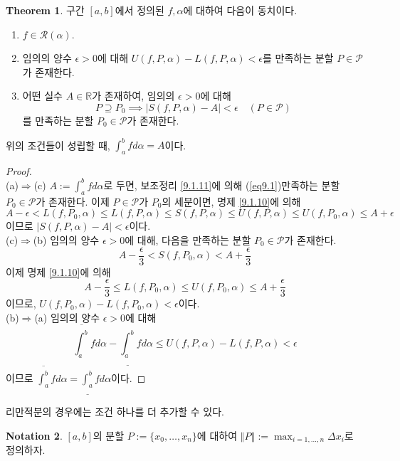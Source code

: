 \documentclass[11pt]{book}
\numberwithin{equation}{chapter}
\def\RR{\mathbb{R}}
\def\eps{\epsilon}
\def\calP{\mathcal{P}}
\def\calR{\mathcal{R}}
\newcommand{\abs}[1]{\left\vert#1\right\vert}
\newcommand{\norm}[1]{\left\Vert#1\right\Vert}
\newcommand{\lowint}[2]{\underline{\int_{#1}^{#2}}}
\newcommand{\upint}[2]{\overline{\int_{#1}^{#2}}}
\theoremstyle{definition}
\newtheorem{thm}{Theorem}[section]
\newtheorem{notn}[thm]{Notation}
\newenvironment{enum}
	{\begin{enumerate}[label=(\alph*), leftmargin=2\parindent]}
	{\end{enumerate}}
\begin{document}
\begin{thm} \label{9.1.12}
    구간 \([a, b]\)에서 정의된 \(f, \alpha\)에 대하여 다음이 동치이다.
    \begin{enum}
        \item \(f \in \calR(\alpha)\).
        \item 임의의 양수 \(\eps > 0\)에 대해 \(U(f, P, \alpha) - L(f, P, \alpha) < \eps\)를 만족하는 분할 \(P \in \calP\)가 존재한다.
        \item 어떤 실수 \(A \in \RR\)가 존재하여, 임의의 \(\eps > 0\)에 대해
        \[
            P \supseteq P_0 \implies \abs{S(f, P, \alpha) - A} < \eps \quad (P \in \calP)
        \]
        를 만족하는 분할 \(P_0 \in \calP\)가 존재한다.
    \end{enum}
    위의 조건들이 성립할 때, \(\displaystyle \int_a^b f d\alpha = A\)이다.
\end{thm}
\begin{proof}
    \quad\\
    (a)\(\Rightarrow\)(c) \(\displaystyle A := \int_a^b f d\alpha\)로 두면, 보조정리 \ref{9.1.11}에 의해 (\ref{eq9.1})\을 만족하는 분할 \(P_0 \in \calP\)가 존재한다. 이제 \(P \in \calP\)가 \(P_0\)의 세분이면, 명제 \ref{9.1.10}에 의해
    \[
        A - \eps < L(f, P_0, \alpha) \le L(f, P, \alpha) \le S(f, P, \alpha) \le U(f, P, \alpha) \le U(f, P_0, \alpha) \le A + \eps
    \]
    이므로 \(\abs{S(f, P, \alpha) - A} < \eps \)이다.\\
    (c)\(\Rightarrow\)(b) 임의의 양수 \(\eps > 0\)에 대해, 다음을 만족하는 분할 \(P_0 \in \calP\)가 존재한다.
    \[
        A - \frac{\eps}{3} < S(f, P_0, \alpha) < A + \frac{\eps}{3}
    \]
    이제 명제 \ref{9.1.10}에 의해
    \[
        A - \frac{\eps}{3} \le L(f, P_0, \alpha) \le U(f, P_0, \alpha) \le A + \frac{\eps}{3}
    \]
    이므로, \(U(f, P_0, \alpha) - L(f, P_0, \alpha) < \eps\)이다.\\
    (b)\(\Rightarrow\)(a) 임의의 양수 \(\eps > 0\)에 대해
    \[
        \upint{a}{b} f d\alpha - \lowint{a}{b} f d\alpha \le U(f, P, \alpha) - L(f, P, \alpha) < \eps
    \]
    이므로 \(\displaystyle \upint{a}{b} f d\alpha = \lowint{a}{b} f d\alpha\)이다.
\end{proof}

리만적분의 경우에는 조건 하나를 더 추가할 수 있다.

\begin{notn}
    \([a, b]\)의 분할 \(P := \{x_0, \ldots, x_n\}\)에 대하여 \(\norm{P} := \max_{i = 1,\ldots, n} \Delta x_i\)로 정의하자.
\end{notn}
\end{document}
